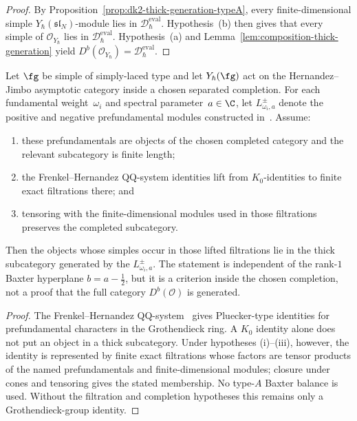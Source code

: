 \begin{proof}
By Proposition~\ref{prop:dk2-thick-generation-typeA}, every
finite-dimensional simple $Y_\hbar(\mathfrak{sl}_N)$-module lies in
$\mathcal{D}_\hbar^{\mathrm{eval}}$.
Hypothesis~(b) then gives that every simple of
$\mathcal{O}_{Y_\hbar}$ lies in
$\mathcal{D}_\hbar^{\mathrm{eval}}$.
Hypothesis~(a) and Lemma~\ref{lem:composition-thick-generation}
yield $D^b(\mathcal{O}_{Y_\hbar}) =
\mathcal{D}_\hbar^{\mathrm{eval}}$.
\end{proof}

\begin{proposition}
\label{prop:mc3-asymptotic-prefundamentals}
Let $\fg$ be simple of simply-laced type and let
$Y_\hbar(\fg)$ act on the Hernandez--Jimbo asymptotic category inside
a chosen separated completion. For each fundamental weight~$\omega_i$
and spectral parameter~$a \in \C$, let $L^{\pm}_{\omega_i, a}$ denote
the positive and negative prefundamental modules constructed
in~\cite{HernandezJimbo12,FrenkelHernandez15}. Assume:
\begin{enumerate}[label=\textup{(\roman*)},nosep]
\item these prefundamentals are objects of the chosen completed
 category and the relevant subcategory is finite length;
\item the Frenkel--Hernandez QQ-system identities lift from
 $K_0$-identities to finite exact filtrations there; and
\item tensoring with the finite-dimensional modules used in those
 filtrations preserves the completed subcategory.
\end{enumerate}
Then the objects whose simples occur in those lifted filtrations lie
in the thick subcategory generated by the
$L^{\pm}_{\omega_i,a}$. The statement is independent of the rank-$1$
Baxter hyperplane $b=a-\tfrac12$, but it is a criterion inside the
chosen completion, not a proof that the full category
$D^b(\mathcal O)$ is generated.
\end{proposition}

\begin{proof}
The Frenkel--Hernandez QQ-system~\cite{FrenkelHernandez15}
gives Pluecker-type identities for prefundamental characters in the
Grothendieck ring. A $K_0$ identity alone does not put an object in a
thick subcategory. Under hypotheses \textup{(i)--(iii)}, however, the
identity is represented by finite exact filtrations whose factors are
tensor products of the named prefundamentals and finite-dimensional
modules; closure under cones and tensoring gives the stated
membership. No type-$A$ Baxter balance is used. Without the filtration
and completion hypotheses this remains only a Grothendieck-group
identity.
\end{proof}

